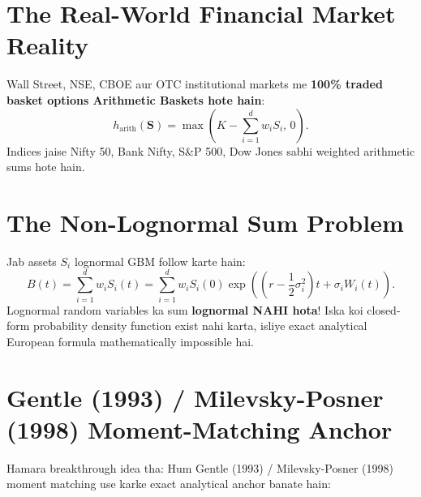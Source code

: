 \documentclass[11pt,a4paper,oneside]{book}
\begin{document}
\section{The Real-World Financial Market Reality}
Wall Street, NSE, CBOE aur OTC institutional markets me \textbf{100\% traded basket options Arithmetic Baskets hote hain}:
\begin{equation}
    h_{\text{arith}}(\mathbf{S}) = \max\left( K - \sum_{i=1}^d w_i S_i, \, 0 \right).
\end{equation}
Indices jaise Nifty 50, Bank Nifty, S\&P 500, Dow Jones sabhi weighted arithmetic sums hote hain.

\section{The Non-Lognormal Sum Problem}
Jab assets $S_i$ lognormal GBM follow karte hain:
\begin{equation}
    B(t) = \sum_{i=1}^d w_i S_i(t) = \sum_{i=1}^d w_i S_i(0) \exp\left( \left(r - \frac{1}{2}\sigma_i^2\right)t + \sigma_i W_i(t) \right).
\end{equation}
Lognormal random variables ka sum \textbf{lognormal NAHI hota}! Iska koi closed-form probability density function exist nahi karta, isliye exact analytical European formula mathematically impossible hai.

\section{Gentle (1993) / Milevsky-Posner (1998) Moment-Matching Anchor}
Hamara breakthrough idea tha: Hum Gentle (1993) / Milevsky-Posner (1998) moment matching use karke exact analytical anchor banate hain:
\end{document}
